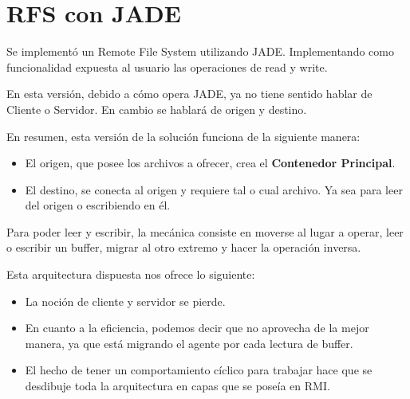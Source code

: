 






\clearpage
\tableofcontents
\clearpage 

\lstset{style=MyStyle}

\section{RFS con JADE}

Se implementó un Remote File System utilizando JADE. Implementando como funcionalidad expuesta al usuario las operaciones de read y write.

En esta versión, debido a cómo opera JADE, ya no tiene sentido hablar de Cliente o Servidor. En cambio se hablará de origen y destino.

En resumen, esta versión de la solución funciona de la siguiente manera:

\begin{itemize}
    \item El origen, que posee los archivos a ofrecer, crea el \textbf{Contenedor Principal}.
    \item El destino, se conecta al origen y requiere tal o cual archivo. Ya sea para leer del origen o escribiendo en él.
\end{itemize}

Para poder leer y escribir, la mecánica consiste en moverse al lugar a operar, leer o escribir un buffer, migrar al otro extremo y hacer la operación inversa.

Esta arquitectura dispuesta nos ofrece lo siguiente:

\begin{itemize}
    \item La noción de cliente y servidor se pierde.
    \item En cuanto a la eficiencia, podemos decir que no aprovecha de la mejor manera, ya que está migrando el agente por cada lectura de buffer.
    \item El hecho de tener un comportamiento cíclico para trabajar hace que se desdibuje toda la arquitectura en capas que se poseía en RMI.
\end{itemize}

